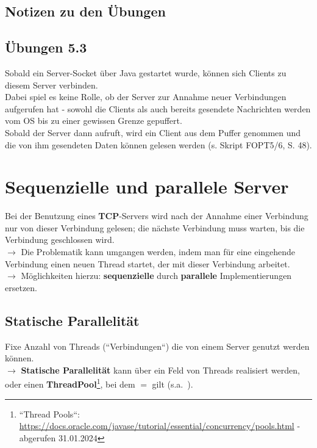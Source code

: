 \subsection{Notizen zu den Übungen}
\subsection*{Übungen 5.3}
Sobald ein Server-Socket über Java gestartet wurde, können sich Clients zu diesem Server verbinden.\\
Dabei spiel es keine Rolle, ob der Server  zur Annahme neuer Verbindungen aufgerufen hat - sowohl die Clients als auch bereits gesendete Nachrichten werden vom OS bis zu einer gewissen Grenze gepuffert.\\
Sobald der Server dann  aufruft, wird ein Client aus dem Puffer genommen und die von ihm gesendeten Daten können gelesen werden (s. Skript FOPT5/6, S. 48).

\section{Sequenzielle und parallele Server}\label{sec:seqparserver}

Bei der Benutzung eines \textbf{TCP}-Servers wird nach der Annahme einer Verbindung nur von dieser Verbindung gelesen; die nächste Verbindung muss warten, bis die Verbindung geschlossen wird.\\
$\rightarrow$ Die Problematik kann umgangen werden, indem man für eine eingehende Verbindung einen neuen Thread startet, der mit dieser Verbindung arbeitet.\\

\noindent
$\rightarrow$ Möglichkeiten hierzu: \textbf{sequenzielle} durch \textbf{parallele} Implementierungen ersetzen.\\

\subsection*{Statische Parallelität}
Fixe Anzahl von Threads (``Verbindungen``) die von einem Server genutzt werden können.\\

$\rightarrow$ \textbf{Statische Parallelität} kann über ein Feld von Threads realisiert werden, oder einen \textbf{ThreadPool}\footnote{
``Thread Pools``: \url{https://docs.oracle.com/javase/tutorial/essential/concurrency/pools.html} - abgerufen 31.01.2024
}, bei dem  $=$  gilt (s.a.~\cite[146]{Oec22}).\\

